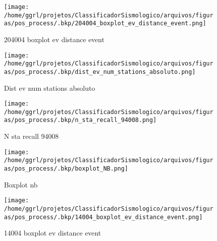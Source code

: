                     \begin{figure}[H]
                        \centering
                        \texttt{[image: /home/ggrl/projetos/ClassificadorSismologico/arquivos/figuras/pos\_process/.bkp/204004\_boxplot\_ev\_distance\_event.png]}
                        \caption{204004 boxplot ev distance event}
                        \label{fig:204004_boxplot_ev_distance_event}
                    \end{figure}
                

                    \begin{figure}[H]
                        \centering
                        \texttt{[image: /home/ggrl/projetos/ClassificadorSismologico/arquivos/figuras/pos\_process/.bkp/dist\_ev\_num\_stations\_absoluto.png]}
                        \caption{Dist ev num stations absoluto}
                        \label{fig:dist_ev_num_stations_absoluto}
                    \end{figure}
                

                    \begin{figure}[H]
                        \centering
                        \texttt{[image: /home/ggrl/projetos/ClassificadorSismologico/arquivos/figuras/pos\_process/.bkp/n\_sta\_recall\_94008.png]}
                        \caption{N sta recall 94008}
                        \label{fig:n_sta_recall_94008}
                    \end{figure}
                

                    \begin{figure}[H]
                        \centering
                        \texttt{[image: /home/ggrl/projetos/ClassificadorSismologico/arquivos/figuras/pos\_process/.bkp/boxplot\_NB.png]}
                        \caption{Boxplot nb}
                        \label{fig:boxplot_NB}
                    \end{figure}
                

                    \begin{figure}[H]
                        \centering
                        \texttt{[image: /home/ggrl/projetos/ClassificadorSismologico/arquivos/figuras/pos\_process/.bkp/14004\_boxplot\_ev\_distance\_event.png]}
                        \caption{14004 boxplot ev distance event}
                        \label{fig:14004_boxplot_ev_distance_event}
                    \end{figure}
                

